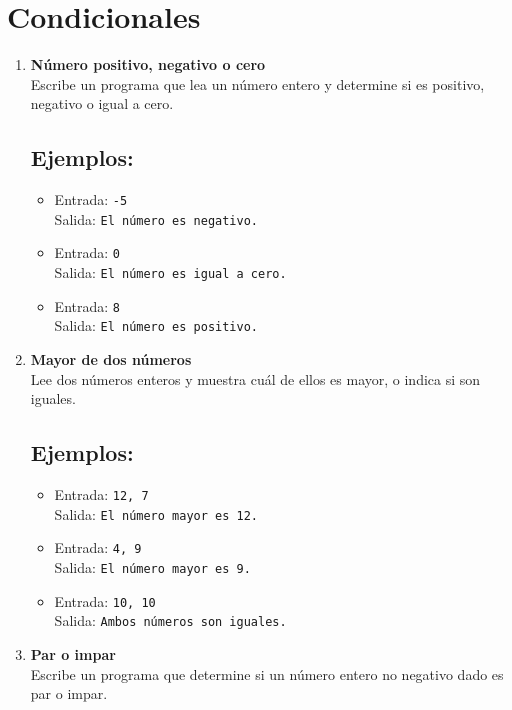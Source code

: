 \section{Condicionales}
\begin{enumerate}
    \item \textbf{Número positivo, negativo o cero}\\
    Escribe un programa que lea un número entero y determine si es positivo, negativo o igual a cero.
    \subsection*{Ejemplos:}
    \begin{itemize}
        \item Entrada: \texttt{-5}\\
              Salida: \texttt{El número es negativo.}
        \item Entrada: \texttt{0}\\
              Salida: \texttt{El número es igual a cero.}
        \item Entrada: \texttt{8}\\
              Salida: \texttt{El número es positivo.}
    \end{itemize}

    \item \textbf{Mayor de dos números}\\
    Lee dos números enteros y muestra cuál de ellos es mayor, o indica si son iguales.
    \subsection*{Ejemplos:}
    \begin{itemize}
        \item Entrada: \texttt{12, 7}\\
              Salida: \texttt{El número mayor es 12.}
        \item Entrada: \texttt{4, 9}\\
              Salida: \texttt{El número mayor es 9.}
        \item Entrada: \texttt{10, 10}\\
              Salida: \texttt{Ambos números son iguales.}
    \end{itemize}

    \item \textbf{Par o impar}\\
    Escribe un programa que determine si un número entero no negativo dado es par o impar.

\end{enumerate}
